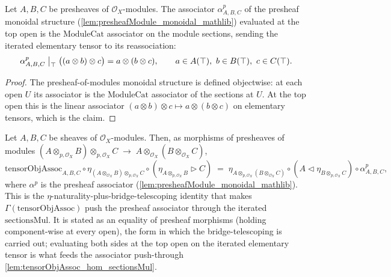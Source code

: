 \begin{lemma}

  \label{lem:presheafAssociator_top_apply}
  Let \(A, B, C\) be presheaves of \(\mathcal{O}_X\)-modules. The associator
  \(\alpha^{p}_{A,B,C}\) of the presheaf monoidal structure
  (\cref{lem:presheafModule_monoidal_mathlib}) evaluated at the top open is the
  \(\mathrm{ModuleCat}\) associator on the module sections, sending the iterated
  elementary tensor to its reassociation:
  \[
    \alpha^{p}_{A,B,C}\bigm|_{\top}\bigl((a \otimes b) \otimes c\bigr)
      = a \otimes (b \otimes c),
    \qquad a \in A(\top),\ b \in B(\top),\ c \in C(\top).
  \]
\end{lemma}

\begin{proof}
  \leanok
  The presheaf-of-modules monoidal structure is defined objectwise: at each open
  \(U\) its associator is the \(\mathrm{ModuleCat}\) associator of the sections at
  \(U\). At the top open this is the linear associator
  \((a \otimes b) \otimes c \mapsto a \otimes (b \otimes c)\) on elementary
  tensors, which is the claim.
\end{proof}

\begin{lemma}

  \label{lem:tensorObjAssoc_eta_factor}
  Let \(A, B, C\) be sheaves of \(\mathcal{O}_X\)-modules. Then, as morphisms of
  presheaves of modules
  \((A \otimes_{p,\mathcal{O}_X} B) \otimes_{p,\mathcal{O}_X} C
    \;\longrightarrow\; A \otimes_{\mathcal{O}_X} (B \otimes_{\mathcal{O}_X} C)\),
  \[
    \mathrm{tensorObjAssoc}_{A,B,C}
      \circ \eta_{(A \otimes_{\mathcal{O}_X} B) \otimes_{p,\mathcal{O}_X} C}
      \circ (\eta_{A \otimes_{p,\mathcal{O}_X} B} \rhd C)
    \;=\;
    \eta_{A \otimes_{p,\mathcal{O}_X} (B \otimes_{\mathcal{O}_X} C)}
      \circ (A \lhd \eta_{B \otimes_{p,\mathcal{O}_X} C})
      \circ \alpha^{p}_{A,B,C},
  \]
  where \(\alpha^{p}\) is the presheaf associator
  (\cref{lem:presheafModule_monoidal_mathlib}). This is the
  \(\eta\)-naturality-plus-bridge-telescoping identity that makes
  \(\Gamma(\mathrm{tensorObjAssoc})\) push the presheaf associator through the
  iterated \(\mathrm{sectionsMul}\). It is stated as an equality of presheaf
  morphisms (holding component-wise at every open), the form in which the
  bridge-telescoping is carried out; evaluating both sides at the top open on the
  iterated elementary tensor is what feeds the associator push-through
  \cref{lem:tensorObjAssoc_hom_sectionsMul}.
\end{lemma}

